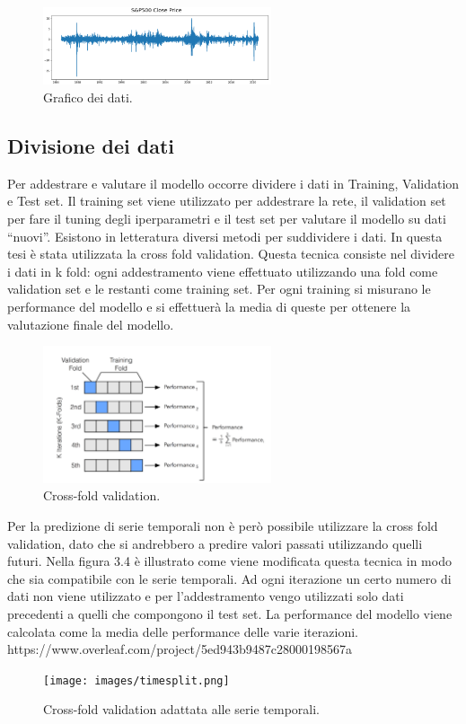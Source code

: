 \documentclass[12pt,a4paper,twoside,openright]{book}
\begin{document}
\begin{figure}[H]
\centering
\includegraphics[width=0.6\textwidth]{images/data3.png}
\caption{Grafico dei dati.}
\label{fig:rapp_file}
\end{figure}

\subsection{Divisione dei dati}
Per addestrare e valutare il modello occorre dividere i dati in Training, Validation e Test set. Il training set viene utilizzato per addestrare la rete, il validation set per fare il tuning degli iperparametri e il test set per valutare il modello su dati “nuovi”.
Esistono in letteratura diversi metodi per suddividere i dati. In questa tesi è stata utilizzata la cross fold validation. Questa tecnica consiste nel dividere i dati in k fold: ogni addestramento viene effettuato utilizzando una fold come validation set e le restanti come training set. Per ogni training si misurano le performance del modello e si effettuerà la media di queste per ottenere la valutazione finale del modello.

\begin{figure}[H]
\centering
\includegraphics[width=0.6\textwidth]{images/kfolds.png}
\caption{Cross-fold validation.}
\label{fig:rapp_file}
\end{figure}

Per la predizione di serie temporali non è però possibile utilizzare la cross fold validation, dato che si andrebbero a predire valori passati utilizzando quelli futuri.
Nella figura 3.4 è illustrato come viene modificata questa tecnica in modo che sia compatibile con le serie temporali.
Ad ogni iterazione un certo numero di dati non viene utilizzato e per l’addestramento vengo utilizzati solo dati precedenti a quelli che compongono il test set. La performance del modello viene calcolata come la media delle performance delle varie iterazioni.
https://www.overleaf.com/project/5ed943b9487c28000198567a
\begin{figure}[H]
\centering
\texttt{[image: images/timesplit.png]}
\caption{Cross-fold validation adattata alle serie temporali.}
\label{fig:rapp_file}
\end{figure}
\end{document}
